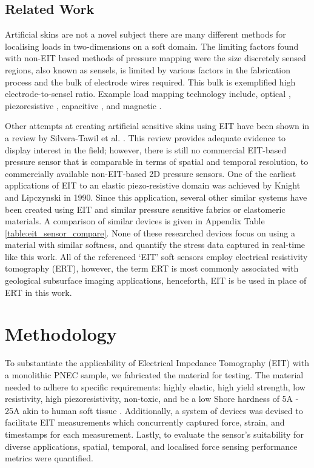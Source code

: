\subsection{Related Work} \label{sec:Related Work}
Artificial skins are not a novel subject there are many different methods for localising loads in two-dimensions on a soft domain. The limiting factors found with non-EIT based methods of pressure mapping were the size discretely sensed regions, also known as sensels, is limited by various factors in the fabrication process and the bulk of electrode wires required. This bulk is exemplified high electrode-to-sensel ratio. Example load mapping technology include, optical \citep{Ramuz2012,Shimadera2022,Rossiter2005}, piezoresistive \citep{Gilanizadehdizaj2022,Fu2020,Yang2022}, capacitive \citep{Liang2015}, and magnetic \citep{Yan2021}.


Other attempts at creating artificial sensitive skins using EIT have been shown in a review by Silvera-Tawil et al. \cite{Silvera-Tawil2015}. This review provides adequate evidence to display interest in the field; however, there is still no commercial EIT-based pressure sensor that is comparable in terms of spatial and temporal resolution, to commercially available non-EIT-based 2D pressure sensors.
One of the earliest applications of EIT to an elastic piezo-resistive domain was achieved by Knight and Lipczynski \cite{Knight1990} in 1990. Since this application, several other similar systems have been created using EIT and similar pressure sensitive fabrics or elastomeric materials\cite{Nagakubo2007,Russo2017,Sun2020,Silvera-Tawil2015,Yoon2017,Kato2007,Biasi2022}. A comparison of similar devices is given in Appendix Table \ref{table:eit_sensor_compare}. None of these researched devices focus on using a material with similar softness, and quantify the stress data captured in real-time like this work. All of the referenced `EIT' soft sensors employ electrical resistivity tomography (ERT), however, the term ERT is most commonly associated with geological subsurface imaging applications, henceforth, EIT is be used in place of ERT in this work.



\section{Methodology} \label{sec:Methodology}
To substantiate the applicability of Electrical Impedance Tomography (EIT) with a monolithic PNEC sample, we fabricated the material for testing. The material needed to adhere to specific requirements: highly elastic,  high yield strength, low resistivity, high piezoresistivity, non-toxic, and be a low Shore hardness of 5A - 25A akin to human soft tissue \citep{Silvera-Tawil2015,Chatzistergos2022,McDermott2017,Landry2021}. Additionally, a system of devices was devised to facilitate EIT measurements which concurrently captured force, strain, and timestamps for each measurement. Lastly, to evaluate the sensor's suitability for diverse applications, spatial, temporal, and localised force sensing performance metrics were quantified.


